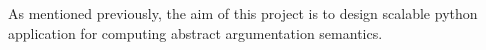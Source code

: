 As mentioned previously, the aim of this project is to design scalable python application for computing abstract argumentation semantics.  
